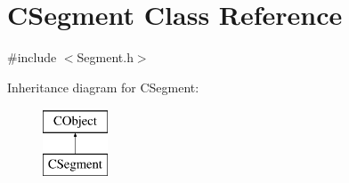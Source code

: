 \hypertarget{classCSegment}{}\section{C\+Segment Class Reference}
\label{classCSegment}


{\ttfamily \#include $<$Segment.\+h$>$}

Inheritance diagram for C\+Segment\+:\begin{figure}[H]
\begin{center}
\leavevmode
\includegraphics[height=2.000000cm]{classCSegment}
\end{center}
\end{figure}
